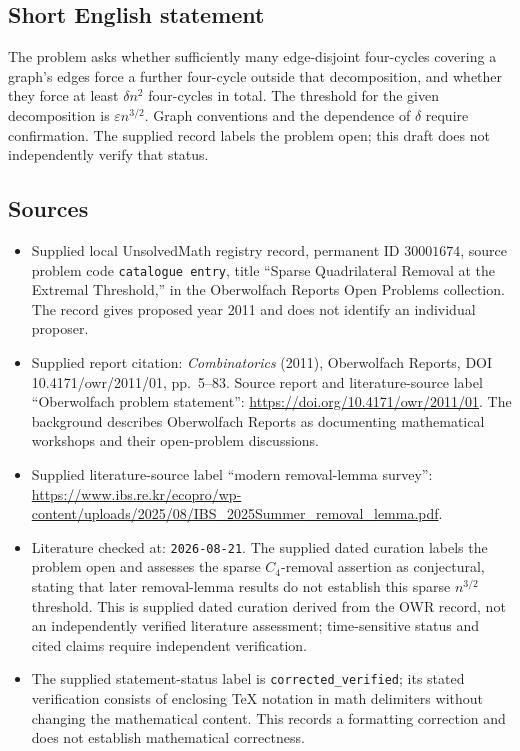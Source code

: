 \documentclass[11pt]{article}
\begin{document}
\subsection{Short English statement}
The problem asks whether sufficiently many edge-disjoint four-cycles covering a graph's edges force a further four-cycle outside that decomposition, and whether they force at least \(\delta n^2\) four-cycles in total. The threshold for the given decomposition is \(\varepsilon n^{3/2}\). Graph conventions and the dependence of \(\delta\) require confirmation. The supplied record labels the problem open; this draft does not independently verify that status.
\subsection{Sources}
\begin{itemize}
\item Supplied local UnsolvedMath registry record, permanent ID \(30001674\), source problem code \texttt{catalogue entry}, title ``Sparse Quadrilateral Removal at the Extremal Threshold,'' in the Oberwolfach Reports Open Problems collection. The record gives proposed year 2011 and does not identify an individual proposer.
\item Supplied report citation: \emph{Combinatorics} (2011), Oberwolfach Reports, DOI 10.4171/owr/2011/01, pp.\ 5--83. Source report and literature-source label ``Oberwolfach problem statement'': \url{https://doi.org/10.4171/owr/2011/01}. The background describes Oberwolfach Reports as documenting mathematical workshops and their open-problem discussions.
\item Supplied literature-source label ``modern removal-lemma survey'': \url{https://www.ibs.re.kr/ecopro/wp-content/uploads/2025/08/IBS_2025Summer_removal_lemma.pdf}.
\item Literature checked at: \texttt{2026-08-21}. The supplied dated curation labels the problem open and assesses the sparse \(C_4\)-removal assertion as conjectural, stating that later removal-lemma results do not establish this sparse \(n^{3/2}\) threshold. This is supplied dated curation derived from the OWR record, not an independently verified literature assessment; time-sensitive status and cited claims require independent verification.
\item The supplied statement-status label is \texttt{corrected\_verified}; its stated verification consists of enclosing TeX notation in math delimiters without changing the mathematical content. This records a formatting correction and does not establish mathematical correctness.
\end{itemize}
\end{document}
